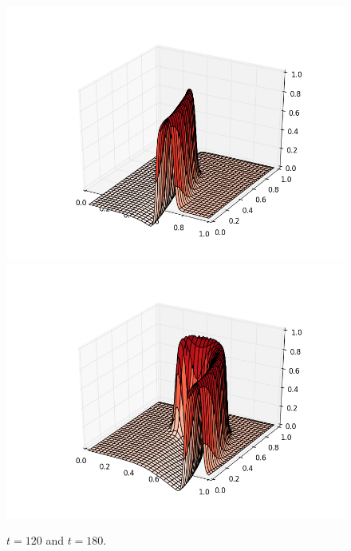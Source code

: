 \documentclass[12pt]{article}
\begin{document}
\begin{figure}[H]
\includegraphics[scale=0.4]{partc_fig_frames/partc_fig05.png}%
\includegraphics[scale=0.4]{partc_fig_frames/partc_fig07.png}
\caption{$t=120$ and $t=180$.}
\end{figure}
\end{document}
